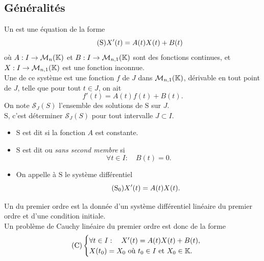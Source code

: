 \documentclass{book}
\begin{document}
\subsection{Généralités}
\begin{Definition}
Un  est une équation de la forme
\[\tag{$\mathrm{S}$} X'(t) = A(t) X(t) + B(t)\]
où $A:I\to \mathcal{M}_{n}(\mathbb{K})$ et $B: I\to \mathcal{M}_{n,1}(\mathbb{K})$ sont des fonctions continues,
et $X: I\to \mathcal{M}_{n,1}(\mathbb{K})$ est une fonction inconnue.\\
Une  de ce système est une fonction $f$ de $J$ dans $\mathcal{M}_{n,1}(\mathbb{K})$,
dérivable en tout point de $J$, telle que pour tout $t\in J$, on ait
\[f'(t) = A(t) f(t) + B(t).\]
On note $\mathcal{S}_J(S)$ l'ensemble des solutions de $\mathrm{S}$ sur $J$.\\
 $\mathrm{S}$, c'est déterminer $\mathcal{S}_J(S)$ pour tout intervalle $J\subset I$.
\begin{itemize}
\item $\mathrm{S}$ est dit 
  si  la fonction $A$ est constante.
\item $\mathrm{S}$ est dit  ou \emph{sans second membre}
  si \[\forall t\in I :\quad B(t) = 0.\]
  \item On appelle  à $\mathrm{S}$
  le système différentiel
  \[\tag{$\mathrm{S_0}$} X'(t) = A(t) X(t).\]
\end{itemize}
\end{Definition}
\begin{Definition}
Un  du premier ordre est la donnée d'un système différentiel linéaire du premier ordre
et d'une condition initiale.\\
Un problème de Cauchy linéaire du premier ordre est donc de la forme
\[\tag{$\mathrm{C}$} \begin{cases}
    \forall t\in I:\quad X'(t) = A(t)X(t) + B(t), \\
    X(t_0) = X_0 \text{ où $t_0 \in I$ et $X_0\in \K     $.}
\end{cases}\]
\end{Definition}
\end{document}
